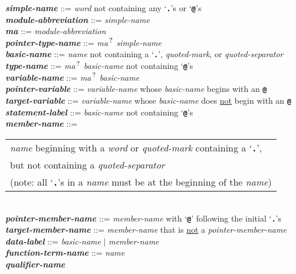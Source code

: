 \documentclass[12pt]{article}
\newcommand{\TT}[1]{{\tt \bfseries #1}}
\newcommand{\QMARK}{{$^{\,\mbox{\footnotesize ?}}$}}
\newcommand{\MA}{{\em ma}\QMARK}
\newcommand{\emkey}[1]{{\em \bfseries #1}}
\newenvironment{indpar}[1][0.3in]%
	{\begin{list}{}%
		     {\setlength{\itemsep}{0in}%
		      \setlength{\topsep}{0in}%
		      \setlength{\parsep}{1ex}%
		      \setlength{\labelwidth}{#1}%
		      \setlength{\leftmargin}{#1}%
		      \addtolength{\leftmargin}{\labelsep}}%
	 \item}%
	{\end{list}}
\begin{document}
\begin{indpar}
\emkey{simple-name} ::= {\em word} not containing any `\TT{.}'s or `\TT{@}'s \\
\emkey{module-abbreviation}\label{MODULE-ABBREVIATION} ::= {\em simple-name} \\
\emkey{ma} ::= {\em module-abbreviation} \\
\emkey{pointer-type-name}\label{POINTER-TYPE-NAME} ::=
    \MA{} {\em simple-name}
\\[1ex]
\emkey{basic-name}\label{BASIC-NAME} ::=
	    {\em name} not containing a `\TT{.}', {\em quoted-mark}, or
	    {\em quoted-separator} \\
\emkey{type-name}\label{TYPE-NAME} ::=
    \MA{} {\em basic-name} not containing `\TT{@}'s \\
\emkey{variable-name}\label{VARIABLE-NAME} ::=
    \MA{} {\em basic-name} \\
\emkey{pointer-variable}\label{POINTER-VARIABLE} ::=
    {\em variable-name} whose {\em basic-name} begins with an \TT{@} \\
\emkey{target-variable}\label{TARGET-VARIABLE} ::=
    {\em variable-name} whose {\em basic-name} does \underline{not}
    begin with an \TT{@} \\
\emkey{statement-label} ::= {\em basic-name}
    \label{STATEMENT-LABEL} not containing `\TT{@}'s
\\[1ex]
\emkey{member-name}\label{MEMBER-NAME}
	::= \begin{tabular}[t]{@{}l@{}}
                        {\em name} beginning with a {\em word} or
			{\em quoted-mark} containing a `\TT{.}', \\
			but not containing a {\em quoted-separator} \\
			(note: all `\TT{.}'s in a {\em name} must be at
			 the beginning of the {\em name})
			\end{tabular} \\
\emkey{pointer-member-name}\label{POINTER-MEMBER-NAME} ::=
    {\em member-name} with `\TT{@}' following the initial `\TT{.}'s \\
\emkey{target-member-name}\label{TARGET-MEMBER-NAME} ::=
    {\em member-name} that is \underline{not} a {\em pointer-member-name}
\\[1ex]
\emkey{data-label}\label{DATA-LABEL} ::=
    {\em basic-name} $|$ {\em member-name}
\\[1ex]
\emkey{function-term-name} ::= {\em name}
    \label{FUNCTION-TERM-NAME}
\\[1ex]
\emkey{qualifier-name}\label{QUALIFIER-NAME}

\end{indpar}
\end{document}
